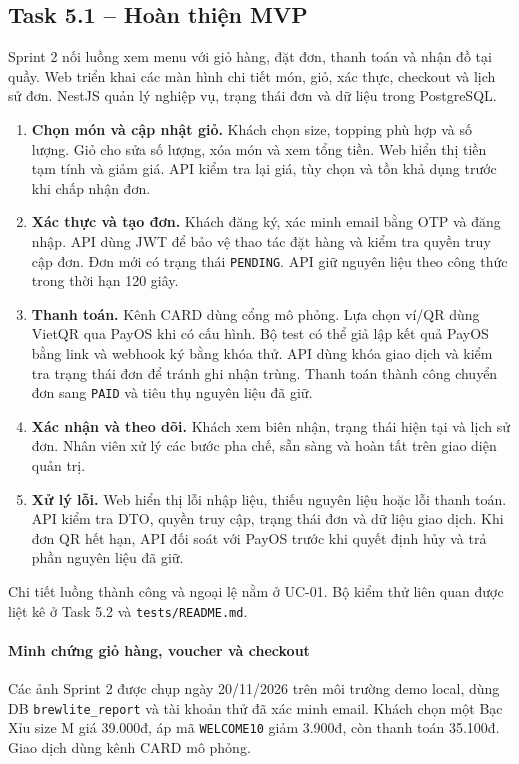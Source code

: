 \subsection{Task 5.1 -- Hoàn thiện MVP}

Sprint 2 nối luồng xem menu với giỏ hàng, đặt đơn, thanh toán và nhận đồ tại
quầy. Web triển khai các màn hình chi tiết món, giỏ, xác thực, checkout và lịch
sử đơn. NestJS quản lý nghiệp vụ, trạng thái đơn và dữ liệu trong PostgreSQL.

\begin{enumerate}[leftmargin=*]
  \item \textbf{Chọn món và cập nhật giỏ.} Khách chọn size, topping phù hợp và
        số lượng. Giỏ cho sửa số lượng, xóa món và xem tổng tiền. Web hiển
        thị tiền tạm tính và giảm giá. API kiểm tra lại giá, tùy chọn và tồn
        khả dụng trước khi chấp nhận đơn.
  \item \textbf{Xác thực và tạo đơn.} Khách đăng ký, xác minh email bằng OTP
        và đăng nhập. API dùng JWT để bảo vệ thao tác đặt hàng và kiểm tra
        quyền truy cập đơn. Đơn mới có trạng thái \texttt{PENDING}. API giữ
        nguyên liệu theo công thức trong thời hạn 120 giây.
  \item \textbf{Thanh toán.} Kênh CARD dùng cổng mô phỏng. Lựa chọn ví/QR
        dùng VietQR qua PayOS khi có cấu hình. Bộ test có thể giả lập kết quả
        PayOS bằng link và webhook ký bằng khóa thử. API dùng khóa giao
        dịch và kiểm tra trạng thái đơn để tránh ghi nhận trùng. Thanh toán
        thành công chuyển đơn sang \texttt{PAID} và tiêu thụ nguyên liệu đã giữ.
  \item \textbf{Xác nhận và theo dõi.} Khách xem biên nhận, trạng thái hiện
        tại và lịch sử đơn. Nhân viên xử lý các bước pha chế, sẵn sàng và hoàn
        tất trên giao diện quản trị.
  \item \textbf{Xử lý lỗi.} Web hiển thị lỗi nhập liệu, thiếu nguyên liệu hoặc
        lỗi thanh toán. API kiểm tra DTO, quyền truy cập, trạng thái đơn và
        dữ liệu giao dịch. Khi đơn QR hết hạn, API đối soát với PayOS trước
        khi quyết định hủy và trả phần nguyên liệu đã giữ.
\end{enumerate}

Chi tiết luồng thành công và ngoại lệ nằm ở UC-01. Bộ kiểm thử liên quan được
liệt kê ở Task 5.2 và \nolinkurl{tests/README.md}.

\paragraph{Minh chứng giỏ hàng, voucher và checkout}
Các ảnh Sprint 2 được chụp ngày 20/11/2026 trên môi trường demo local,
dùng DB \nolinkurl{brewlite_report} và tài khoản thử đã xác minh email.
Khách chọn một Bạc Xỉu size M giá 39.000đ, áp mã \texttt{WELCOME10} giảm
3.900đ, còn thanh toán 35.100đ. Giao dịch dùng kênh CARD mô phỏng.


